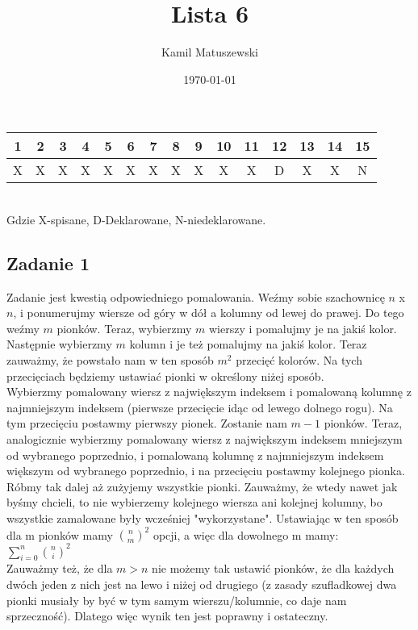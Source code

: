 \documentclass[a4paper]{article}
\title{Lista 6}
\author{Kamil Matuszewski}
\date{\today}
\begin{document}
\maketitle
\setlength{\parindent}{0.5ex}
\setlength{\parskip}{1.5ex}

\begin{center}
\begin{tabular}{|c *{13}{|c} |c|} & 2 & 3 & 4 & 5 & 6 & 7 & 8 & 9 & 10 & 11 & 12 & 13 & 14 & 15\\
\hline 
X & X & X & X & X & X & X & X & X & X & X & D & X & X &N\\
\hline
\end{tabular}\\
Gdzie X-spisane, D-Deklarowane, N-niedeklarowane.
\end{center}

\subsection*{Zadanie 1}
Zadanie jest kwestią odpowiedniego pomalowania. Weźmy sobie szachownicę $n$ x $n$, i ponumerujmy wiersze od góry w dół a kolumny od lewej do prawej. Do tego weźmy $m$ pionków. Teraz, wybierzmy $m$ wierszy i pomalujmy je na jakiś kolor. Następnie wybierzmy $m$ kolumn i je też pomalujmy na jakiś kolor. Teraz zauważmy, że powstało nam w ten sposób $m^2$ przecięć kolorów. Na tych przecięciach będziemy ustawiać pionki w określony niżej sposób.\\
Wybierzmy pomalowany wiersz z największym indeksem i pomalowaną kolumnę z najmniejszym indeksem (pierwsze przecięcie idąc od lewego dolnego rogu). Na tym przecięciu postawmy pierwszy pionek. Zostanie nam $m-1$ pionków. Teraz, analogicznie wybierzmy pomalowany wiersz z największym indeksem mniejszym od wybranego poprzednio, i pomalowaną kolumnę z najmniejszym indeksem większym od wybranego poprzednio, i na przecięciu postawmy kolejnego pionka. Róbmy tak dalej aż zużyjemy wszystkie pionki. Zauważmy, że wtedy nawet jak byśmy chcieli, to nie wybierzemy kolejnego wiersza ani kolejnej kolumny, bo wszystkie zamalowane były wcześniej "wykorzystane". Ustawiając w ten sposób dla m pionków mamy ${n \choose m}^2$ opcji, a więc dla dowolnego m mamy:\\
$\sum\limits_{i=0}^n {n \choose i}^2$\\
Zauważmy też, że dla $m>n$ nie możemy tak ustawić pionków, że dla każdych dwóch
jeden z nich jest na lewo i niżej od drugiego (z zasady szufladkowej dwa pionki musiały by być w tym samym wierszu/kolumnie, co daje nam sprzeczność). Dlatego więc wynik ten jest poprawny i ostateczny.
\end{document}
